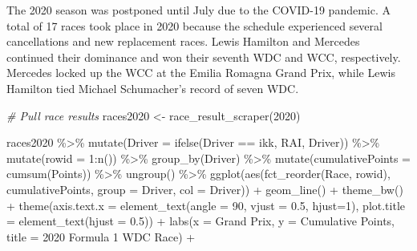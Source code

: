 \documentclass[
]{book}
\newenvironment{Shaded}{\begin{snugshade}}{\end{snugshade}}
\newcommand{\AttributeTok}[1]{\textcolor[rgb]{0.77,0.63,0.00}{#1}}
\newcommand{\CommentTok}[1]{\textcolor[rgb]{0.56,0.35,0.01}{\textit{#1}}}
\newcommand{\DecValTok}[1]{\textcolor[rgb]{0.00,0.00,0.81}{#1}}
\newcommand{\FloatTok}[1]{\textcolor[rgb]{0.00,0.00,0.81}{#1}}
\newcommand{\FunctionTok}[1]{\textcolor[rgb]{0.00,0.00,0.00}{#1}}
\newcommand{\NormalTok}[1]{#1}
\newcommand{\OtherTok}[1]{\textcolor[rgb]{0.56,0.35,0.01}{#1}}
\newcommand{\SpecialCharTok}[1]{\textcolor[rgb]{0.00,0.00,0.00}{#1}}
\newcommand{\StringTok}[1]{\textcolor[rgb]{0.31,0.60,0.02}{#1}}
\begin{document}
The 2020 season was postponed until July due to the COVID-19 pandemic. A total of 17 races took place in 2020 because the schedule experienced several cancellations and new replacement races. Lewis Hamilton and Mercedes continued their dominance and won their seventh WDC and WCC, respectively. Mercedes locked up the WCC at the Emilia Romagna Grand Prix, while Lewis Hamilton tied Michael Schumacher's record of seven WDC.

\begin{Shaded}
\begin{Highlighting}[]
\CommentTok{\# Pull race results}
\NormalTok{races2020 }\OtherTok{\textless{}{-}} \FunctionTok{race\_result\_scraper}\NormalTok{(}\DecValTok{2020}\NormalTok{)}

\NormalTok{races2020 }\SpecialCharTok{\%\textgreater{}\%}
  \FunctionTok{mutate}\NormalTok{(}\AttributeTok{Driver =} \FunctionTok{ifelse}\NormalTok{(Driver }\SpecialCharTok{==} \StringTok{\textquotesingle{}ikk\textquotesingle{}}\NormalTok{, }\StringTok{\textquotesingle{}RAI\textquotesingle{}}\NormalTok{, Driver)) }\SpecialCharTok{\%\textgreater{}\%} 
  \FunctionTok{mutate}\NormalTok{(}\AttributeTok{rowid =} \DecValTok{1}\SpecialCharTok{:}\FunctionTok{n}\NormalTok{()) }\SpecialCharTok{\%\textgreater{}\%}
  \FunctionTok{group\_by}\NormalTok{(Driver) }\SpecialCharTok{\%\textgreater{}\%} 
  \FunctionTok{mutate}\NormalTok{(}\AttributeTok{cumulativePoints =} \FunctionTok{cumsum}\NormalTok{(Points)) }\SpecialCharTok{\%\textgreater{}\%}
  \FunctionTok{ungroup}\NormalTok{() }\SpecialCharTok{\%\textgreater{}\%} 
  \FunctionTok{ggplot}\NormalTok{(}\FunctionTok{aes}\NormalTok{(}\FunctionTok{fct\_reorder}\NormalTok{(Race, rowid), cumulativePoints,}
         \AttributeTok{group =}\NormalTok{ Driver, }\AttributeTok{col =}\NormalTok{ Driver)) }\SpecialCharTok{+}
  \FunctionTok{geom\_line}\NormalTok{() }\SpecialCharTok{+}
  \FunctionTok{theme\_bw}\NormalTok{() }\SpecialCharTok{+} 
  \FunctionTok{theme}\NormalTok{(}\AttributeTok{axis.text.x =} \FunctionTok{element\_text}\NormalTok{(}\AttributeTok{angle =} \DecValTok{90}\NormalTok{, }\AttributeTok{vjust =} \FloatTok{0.5}\NormalTok{, }\AttributeTok{hjust=}\DecValTok{1}\NormalTok{),}
        \AttributeTok{plot.title =} \FunctionTok{element\_text}\NormalTok{(}\AttributeTok{hjust =} \FloatTok{0.5}\NormalTok{)) }\SpecialCharTok{+}
  \FunctionTok{labs}\NormalTok{(}\AttributeTok{x =} \StringTok{\textquotesingle{}Grand Prix\textquotesingle{}}\NormalTok{,}
       \AttributeTok{y =} \StringTok{\textquotesingle{}Cumulative Points\textquotesingle{}}\NormalTok{,}
       \AttributeTok{title =} \StringTok{\textquotesingle{}2020 Formula 1 WDC Race\textquotesingle{}}\NormalTok{) }\SpecialCharTok{+}

\end{Highlighting}
\end{Shaded}
\end{document}
